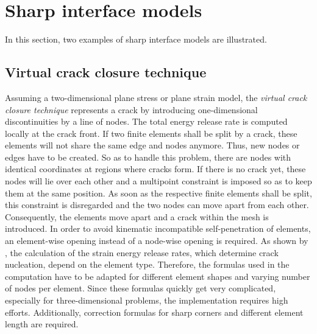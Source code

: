 \appendix

\section{Sharp interface models} \label{appsec:sharp}
In this section, two examples of sharp interface models are illustrated.

\subsection{Virtual crack closure technique} \label{appsec:virtClos}
Assuming a two-dimensional plane stress or plane strain model, the \textit{virtual crack closure technique} represents a crack by introducing one-dimensional discontinuities by a line of nodes. The total energy release rate is computed locally at the crack front. If two finite elements shall be split by a crack, these elements will not share the same edge and nodes anymore. Thus, new nodes or edges have to be created. So as to handle this problem, there are nodes with identical coordinates at regions where cracks form. If there is no crack yet, these nodes will lie over each other and a multipoint constraint is imposed so as to keep them at the same position. As soon as the respective finite elements shall be split, this constraint is disregarded and the two nodes can move apart from each other. Consequently, the elements move apart and a crack within the mesh is introduced. In order to avoid kinematic incompatible self-penetration of elements, an element-wise opening instead of a node-wise opening is required. As shown by \citet{03_SotA_virtClos}, the calculation of the strain energy release rates, which determine crack nucleation, depend on the element type. Therefore, the formulas used in the computation have to be adapted for different element shapes and varying number of nodes per element. Since these formulas quickly get very complicated, especially for three-dimensional problems, the implementation requires high efforts. Additionally, correction formulas for sharp corners and different element length are required. \cite{03_SotA_virtClos} 

